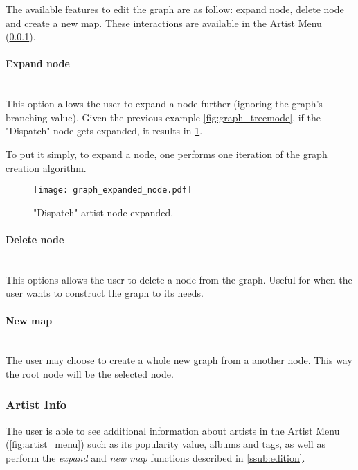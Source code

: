       The available features to edit the graph are as follow: expand node, delete node and create a new map.
      These interactions are available in the Artist Menu (\ref{ssub:artist_info}).

      \paragraph{Expand node} \hfill \\
      This option allows the user to expand a node further (ignoring the graph's branching value).
      Given the previous example \ref{fig:graph_treemode}, if the "Dispatch" node gets expanded, it results in \ref{fig:node_expanded}.

      To put it simply, to expand a node, one performs one iteration of the graph creation algorithm.

      \begin{figure}[tb]
         \begin{center}
           \texttt{[image: graph\_expanded\_node.pdf]}
         \end{center}
         \caption{"Dispatch" artist node expanded.}
         \label{fig:node_expanded}
      \end{figure}

      \paragraph{Delete node} \hfill \\
      This options allows the user to delete a node from the graph.
      Useful for when the user wants to construct the graph to its needs.

      \paragraph{New map} \hfill \\
      The user may choose to create a whole new graph from a another node.
      This way the root node will be the selected node.



    \subsubsection{Artist Info} %
      \label{ssub:artist_info}
      The user is able to see additional information about artists in the Artist Menu (\ref{fig:artist_menu}) such as its popularity value, albums and tags, as well as perform the \emph{expand} and \emph{new map} functions described in \ref{ssub:edition}.

